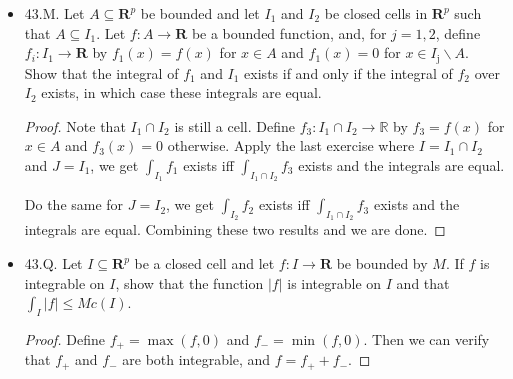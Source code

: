 \begin{itemize}
\begin{proof}
	 Now we assume the integral of $f_J$ over $J$ exists. Take a partition $Q_\varepsilon'$ of $J$ by Cauchy Criterion. 
	 Without loss of generality we may assume that for every cell $A \in Q_\varepsilon'$, either $A \subset I$ or $A \cap I = \emptyset $. This can be achieved by taking refinements.
	 
	 Now we can naturally restrict $Q_\varepsilon'$ to a partition of $I$, call it $Q_\varepsilon$. For every partition $P$ of $I$ finer than $Q_\varepsilon$, let $P' = P \cup \left( Q_\varepsilon' \setminus Q_\varepsilon \right) $, and $P'$ is a partition finer than $Q_\varepsilon'$. We have the exactly same equality as above, and existence of integral of $f_I$ over $I$ is proven similarly.

	 To show equality of integrals, take fine enough $P, P'$ such that
	 \[
	 	\left| \int _{I}f(I) - S(P, f_I) \right| < \varepsilon \qquad
	 	\left| \int _{J}f(J) - S(P', f_J) \right| < \varepsilon
	 .\] 
	 and apply triangle inequality.
 \end{proof}

 \newpage
\item 43.M. Let $A \subseteq \boldsymbol{R}^p$ be bounded and let $I_1$ and $I_2$ be closed cells in $\boldsymbol{R}^p$ such that $A \subseteq I_1$. Let $f: A \rightarrow \boldsymbol{R}$ be a bounded function, and, for $j=1,2$, define $f_i: I_1 \rightarrow \boldsymbol{R}$ by $f_1(x)=f(x)$ for $x \in A$ and $f_1(x)=0$ for $x \in I_{\mathrm{j}} \backslash A$. Show that the integral of $f_1$ and $I_1$ exists if and only if the integral of $f_2$ over $I_2$ exists, in which case these integrals are equal.
\begin{proof}
	Note that $I_1 \cap I_2$ is still a cell. Define $f_3: I_1 \cap I_2 \to \mathbb{R}$ by $f_3 = f(x)$ for $x \in A$ and $f_3(x) = 0$ otherwise. Apply the last exercise where $I = I_1 \cap I_2$ and $J = I_1$, we get  $\int _{I_1}f_1$ exists iff $\int _{I_1 \cap I_2}f_3$ exists and the integrals are equal. 

	Do the same for $J = I_2$, we get  $\int _{I_2}f_2$ exists iff $\int _{I_1 \cap I_2}f_3$ exists and the integrals are equal. Combining these two results and we are done.
\end{proof}

\item 43.Q. Let $I \subseteq \boldsymbol{R}^p$ be a closed cell and let $f: I \rightarrow \boldsymbol{R}$ be bounded by $M$. If $f$ is integrable on $I$, show that the function $|f|$ is integrable on $I$ and that $\int_I|f| \leq M c(I)$.
\begin{proof}
	Define $f_+ = \max(f, 0)$ and $f_- = \min(f, 0)$. Then we can verify that  $f_+$ and $f_-$ are both integrable, and $f = f_+ + f_-$. 


\end{proof}
\end{itemize}
